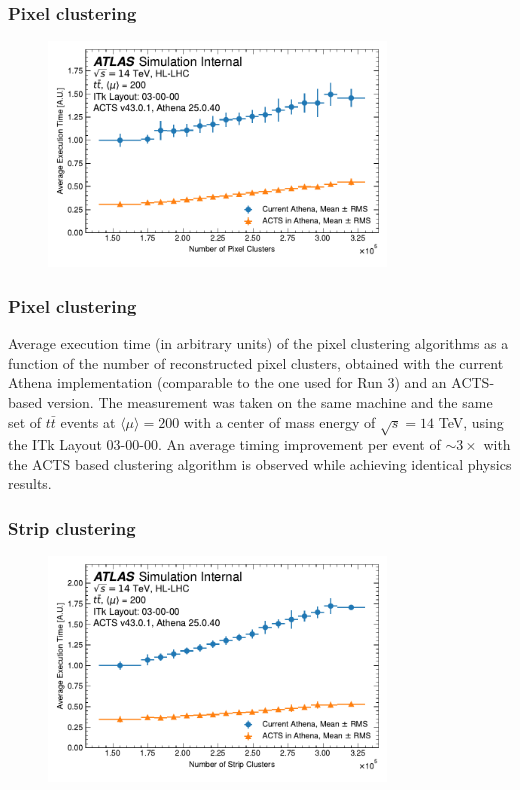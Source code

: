 \documentclass[aspectratio=169]{beamer}
\begin{document}
\begin{frame}
\frametitle{Pixel clustering}
\begin{figure}[h]
    \centering
    \includegraphics[width=0.8\textwidth]{plots/clustering_pixel.pdf}
\end{figure}
\end{frame}

\begin{frame}
\frametitle{Pixel clustering}
Average execution time (in arbitrary units) of the pixel clustering algorithms as a function of the number of reconstructed pixel clusters, obtained with the current Athena implementation (comparable to the one used for Run 3) and an ACTS-based version. The measurement was taken on the same machine and the same set of $t\bar{t}$ events at $\langle \mu \rangle = 200$ with a center of mass energy of $\sqrt{s}=14$ TeV, using the ITk Layout 03-00-00. An average timing improvement per event of $\sim3\times$ with the ACTS based clustering algorithm is observed while achieving identical physics results.
\end{frame}

\begin{frame}
\frametitle{Strip clustering}
\begin{figure}[h]
    \centering
    \includegraphics[width=0.8\textwidth]{plots/clustering_strip.pdf}
\end{figure}
\end{frame}
\end{document}
